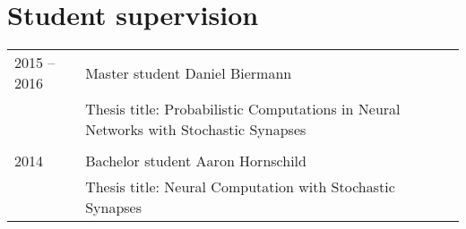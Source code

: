 \section{Student supervision}
\begin{longtable}{>{\hfill}p{1.8cm}|p{11.4cm}}
  2015 -- 2016 & Master student Daniel Biermann \\
  & \footnotesize  Thesis title: Probabilistic Computations in Neural Networks with Stochastic Synapses \\
  \multicolumn{2}{c}{} \\
  2014 & Bachelor student Aaron Hornschild \\
  & \footnotesize Thesis title: Neural Computation with Stochastic Synapses \\
\end{longtable}